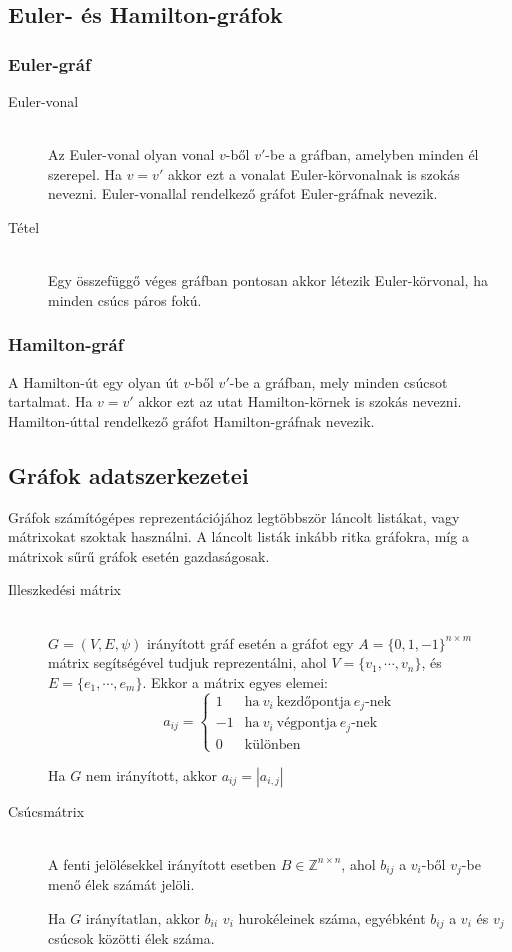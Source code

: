 \documentclass[margin=0px]{article}
\newcommand{\Z}{\mathbb{Z}}
\begin{document}
\subsection{Euler- és Hamilton-gráfok}
\subsubsection{Euler-gráf}
\begin{description}
    \item[Euler-vonal] \hfill \\
        Az Euler-vonal olyan vonal $v$-ből $v'$-be a gráfban, amelyben minden él szerepel. Ha $v=v'$ akkor ezt a vonalat Euler-körvonalnak  is szokás nevezni. Euler-vonallal rendelkező gráfot Euler-gráfnak nevezik.
    \item[Tétel] \hfill \\
        Egy összefüggő véges gráfban pontosan akkor létezik Euler-körvonal, ha minden csúcs páros fokú.
\end{description}
\subsubsection{Hamilton-gráf}
A Hamilton-út egy olyan út $v$-ből $v'$-be a gráfban, mely minden csúcsot tartalmat. Ha $v=v'$ akkor ezt az utat Hamilton-körnek is szokás nevezni. Hamilton-úttal rendelkező gráfot Hamilton-gráfnak nevezik.
\subsection{Gráfok adatszerkezetei}
Gráfok számítógépes reprezentációjához legtöbbször láncolt listákat, vagy mátrixokat szoktak használni. A láncolt listák inkább ritka gráfokra, míg a mátrixok sűrű gráfok esetén gazdaságosak.
\begin{description}
    \item[Illeszkedési mátrix] \hfill \\
        $G = (V,E, \psi)$ irányított gráf esetén a gráfot egy $A = \{0,1,-1\}^{n\times m}$ mátrix segítségével tudjuk reprezentálni, ahol $V = \{v_1,\cdots, v_n\}$, és $E = \{e_1,\cdots,e_m\}$. Ekkor a mátrix egyes elemei:
        \[ a_{ij} =
            \left\{
            \begin{array}{ll}
                1  & \mbox{ha} \ v_i \ \text{kezdőpontja} \ e_j\text{-nek} \\
                -1 & \mbox{ha} \ v_i \ \text{végpontja} \ e_j\text{-nek}   \\
                0  & \mbox{különben}
            \end{array}
            \right.
        \]

        Ha $G$ nem irányított, akkor $a_{ij} = |a_{i,j}|$
    \item[Csúcsmátrix] \hfill \\
        A  fenti jelölésekkel irányított esetben $B \in \Z^{n\times n}$, ahol $b_{ij}$ a $v_i$-ből $v_j$-be menő élek számát jelöli.

        Ha $G$ irányítatlan, akkor $b_{ii}$ $v_i$ hurokéleinek száma, egyébként $b_{ij}$ a $v_i$ és $v_j$ csúcsok közötti élek száma.
\end{description}
\end{document}
